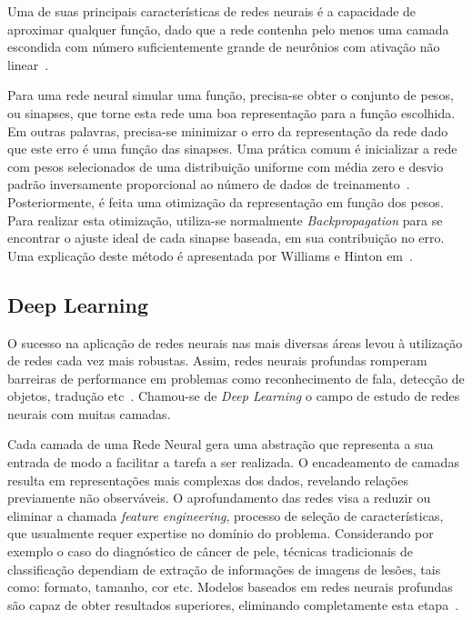 Uma de suas principais características de redes neurais é a capacidade de aproximar qualquer função, dado que a rede
contenha pelo menos uma camada escondida com número suficientemente grande de neurônios com ativação não
linear~\cite{hornik89}.

Para uma rede neural simular uma função, precisa-se obter o conjunto de pesos, ou sinapses, que torne esta rede uma boa
representação para a função escolhida.
Em outras palavras, precisa-se minimizar o erro da representação da rede dado que este erro é uma função das sinapses.
Uma prática comum é inicializar a rede com pesos selecionados de uma distribuição uniforme com média zero e desvio
padrão inversamente proporcional ao número de dados de treinamento~\cite{lecun12}.
Posteriormente, é feita uma otimização da representação em função dos pesos.
Para realizar esta otimização, utiliza-se normalmente \textit{Backpropagation} para se encontrar o ajuste ideal de cada
sinapse baseada, em sua contribuição no erro.
Uma explicação deste método é apresentada por Williams e Hinton em~\cite{williams86}.


\subsection{Deep Learning}

O sucesso na aplicação de redes neurais nas mais diversas áreas levou à utilização de redes cada vez mais robustas.
Assim, redes neurais profundas romperam barreiras de performance em problemas como reconhecimento de fala, detecção de
objetos, tradução etc~\cite{lecun15}.
Chamou-se de \textit{Deep Learning} o campo de estudo de redes neurais com muitas camadas.

Cada camada de uma Rede Neural gera uma abstração que representa a sua entrada de modo a facilitar a tarefa a ser
realizada.
O encadeamento de camadas resulta em representações mais complexas dos dados, revelando relações previamente não
observáveis.
O aprofundamento das redes visa a reduzir ou eliminar a chamada \textit{feature engineering}, processo de seleção de
características, que usualmente requer expertise no domínio do problema.
Considerando por exemplo o caso do diagnóstico de câncer de pele, técnicas tradicionais de classificação dependiam de
extração de informações de imagens de lesões, tais como: formato, tamanho, cor etc.
Modelos baseados em redes neurais profundas são capaz de obter resultados superiores, eliminando completamente esta
etapa~\cite{esteva17}.

